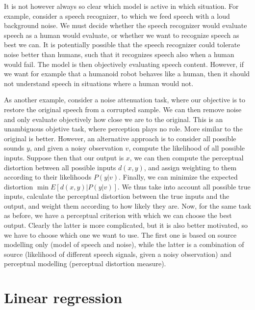 \documentclass[letterpaper,10pt,english]{jupyterBook}
\begin{document}
\sphinxAtStartPar
It is not however always so clear which model is active in which
situation. For example, consider a speech recognizer, to which we feed
speech with a loud background noise. We must decide whether the speech
recognizer would evaluate speech as a human would evaluate, or whether
we want to recognize speech as best we can. It is potentially possible
that the speech recognizer could tolerate noise better than humans, such
that it recognizes speech also when a human would fail. The model is
then objectively evaluating speech content. However, if we want for
example that a humanoid robot behaves like a human, then it should not
understand speech in situations where a human would not.

\sphinxAtStartPar
As another example, consider a noise attenuation task, where our
objective is to restore the original speech from a corrupted sample. We
can then remove noise and only evaluate objectively how close we are to
the original. This is an unambiguous objetive task, where perception
plays no role. More similar to the original is better. However, an
alternative approach is to consider all possible sounds \(y\), and given a
noisy observation \(v\), compute the likelihood of all possible inputs.
Suppose then that our output is \(x\), we can then compute the perceptual
distortion between all possible inputs \(d(x,y)\), and assign weighting to
them according to their likelihoods \(P(y|v)\). Finally, we can
minimize the expected distortion \(\min E[d(x,y) | P(y|v)].\) We thus
take into account all possible true inputs, calculate the perceptual
distortion between the true inputs and the output, and weight them
according to how likely they are. Now, for the same task as before, we
have a perceptual criterion with which we can choose the best output.
Clearly the latter is more complicated, but it is also better motivated,
so we have to choose which one we want to use. The first one is based on
source modelling only (model of speech and noise), while the latter is a
combination of source (likelihood of different speech signals, given a
noisy observation) and perceptual modelling (perceptual distortion
measure).

\sphinxstepscope


\section{Linear regression}
\label{\detokenize{Modelling/Linear_regression:linear-regression}}\label{\detokenize{Modelling/Linear_regression::doc}}
\end{document}
